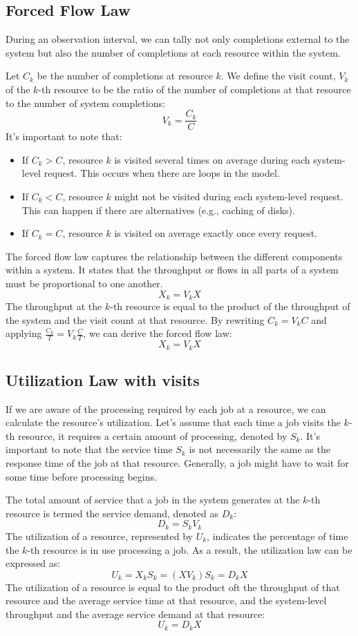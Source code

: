 \subsection{Forced Flow Law}
During an observation interval, we can tally not only completions external to the system but also the number of completions at each resource within the system.

Let $C_k$ be the number of completions at resource $k$. 
We define the visit count, $V_k$ of the $k$-th resource to be the ratio of the number of completions at that resource to the number of system completions:
\[V_k=\dfrac{C_k}{C}\]
It's important to note that:
\begin{itemize}
    \item If $C_k>C$, resource $k$ is visited several times on average during each system-level request. 
        This occurs when there are loops in the model.
    \item If $C_k<C$, resource $k$ might not be visited during each system-level request.
        This can happen if there are alternatives (e.g., caching of disks).
    \item If $C_k=C$, resource $k$ is visited on average exactly once every request.
\end{itemize}
The forced flow law captures the relationship between the different components within a system. 
It states that the throughput or flows in all parts of a system must be proportional to one another.
\[X_k=V_kX\]
The throughput at the $k$-th resource is equal to the product of the throughput of the system and the visit count at that resource.
By rewriting $C_k=V_kC$ and applying $\frac{C_k}{T}=V_k\frac{C}{T}$, we can derive the forced flow law:
\[X_k=V_kX\]

\subsection{Utilization Law with visits}
If we are aware of the processing required by each job at a resource, we can calculate the resource's utilization.
Let's assume that each time a job visits the $k$-th resource, it requires a certain amount of processing, denoted by $S_k$.
It's important to note that the service time $S_k$ is not necessarily the same as the response time of the job at that resource. 
Generally, a job might have to wait for some time before processing begins.

The total amount of service that a job in the system generates at the $k$-th resource is termed the service demand, denoted as $D_k$: 
\[D_k=S_kV_k\]
The utilization of a resource, represented by $U_k$, indicates the percentage of time the $k$-th resource is in use processing a job.
As a result, the utilization law can be expressed as:
\[U_k=X_kS_k=(XV_k)S_k=D_kX\]
The utilization of a resource is equal to the product oft the throughput of that resource and the average service time at that resource, and the system-level throughput and the average service demand at that resource: 
\[U_k=D_kX\]


